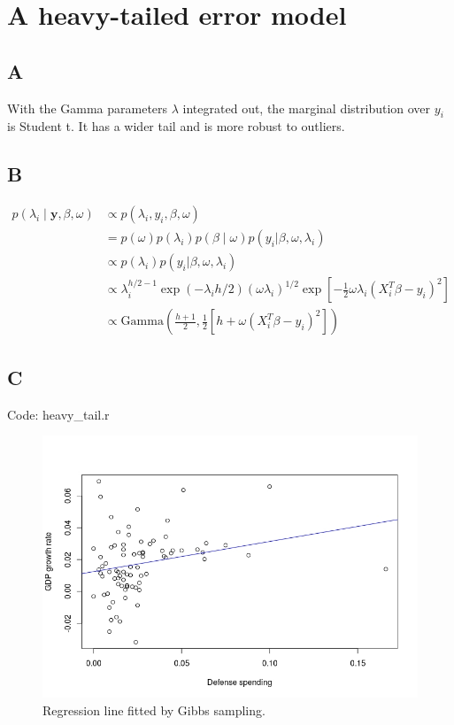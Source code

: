\documentclass{article}
\begin{document}
\section*{A heavy-tailed error model}
\subsection*{A}
With the Gamma parameters \(\lambda\) integrated out, the marginal distribution over \(y_i\) is Student t. It has a wider tail and is more robust to outliers.

\subsection*{B}
\begin{align*}
p(\lambda_i \mid \mathbf{y}, \beta, \omega) & \propto p(\lambda_i, y_i, \beta, \omega)\\
&= p(\omega) p(\lambda_i) p(\beta \mid \omega) p(y_i |\beta , \omega, \lambda_i)\\
&\propto p(\lambda_i)  p(y_i |\beta , \omega, \lambda_i)\\
&\propto \lambda_i ^{h/2 - 1} \exp \left(- \lambda_i h/2 \right) (\omega \lambda_i)^{1/2} \exp \left[ -\frac{1}{2} \omega \lambda_i (X_i^T\beta - y_i)^2 \right]\\
&\propto \mathrm{Gamma}\left(\frac{h+1}{2}, \frac{1}{2}[h + \omega (X_i^T\beta - y_i)^2]\right)
\end{align*}
\subsection*{C}
Code: heavy\_tail.r
\begin{figure}[h!]
\includegraphics[width=\linewidth]{heavy_tail.jpeg}
\caption{Regression line fitted by Gibbs sampling.}
\end{figure}
\end{document}
